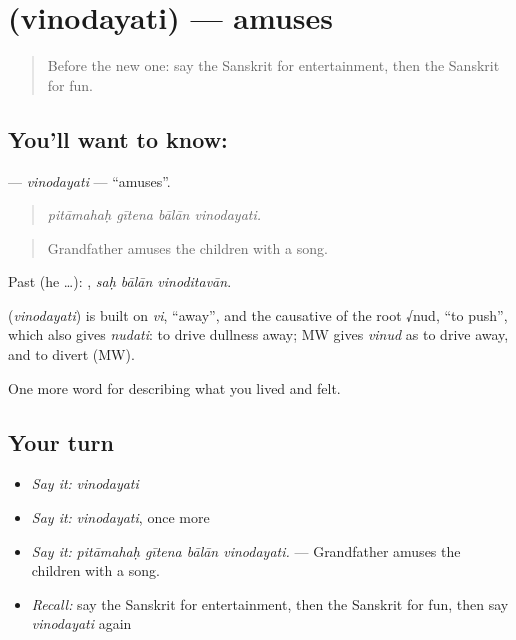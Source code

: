 \section[\texorpdfstring{\sk{विनोदयति} (vinodayati)}{विनोदयति (vinodayati)}]{ (vinodayati) — amuses}

\label{lesson:SA-C516-vinodayati}



\begin{quote}
Before the new one: say the Sanskrit for entertainment, then the Sanskrit for fun.
\end{quote}

\subsection*{You'll want to know: }
\textbf{} — \emph{vinodayati} — \textquotedblleft{}amuses\textquotedblright{}.

\begin{quote}
   
\end{quote}

\begin{quote}
\emph{pitāmahaḥ gītena bālān vinodayati.}
\end{quote}

\begin{quote}
Grandfather amuses the children with a song.
\end{quote}

Past (he …):   , \emph{saḥ bālān vinoditavān}.

\begin{cousinweb}
\textbf{} (\emph{vinodayati}) is built on \emph{vi}, \textquotedblleft{}away\textquotedblright{}, and the causative of the root √nud, \textquotedblleft{}to push\textquotedblright{}, which also gives \emph{nudati}: to drive dullness away; MW gives \emph{vinud} as to drive away, and to divert (MW).
\end{cousinweb}

\begin{grammarlens}[title={What you've built}]
One more word for describing what you lived and felt.
\end{grammarlens}

\subsection*{Your turn}
\begin{itemize}
\raggedright
  \item \emph{Say it:} \emph{vinodayati}
  \item \emph{Say it:} \emph{vinodayati}, once more
  \item \emph{Say it:} \emph{pitāmahaḥ gītena bālān vinodayati.} — Grandfather amuses the children with a song.
  \item \emph{Recall:} say the Sanskrit for entertainment, then the Sanskrit for fun, then say \emph{vinodayati} again
\end{itemize}

